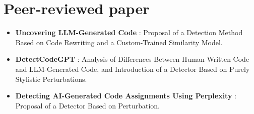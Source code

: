 \section*{Peer-reviewed paper}
\begin{itemize}
    \item \textbf{Uncovering LLM-Generated Code} \cite{ye2025uncovering}: 
    Proposal of a Detection Method Based on Code Rewriting and a Custom-Trained Similarity Model.

    \item \textbf{DetectCodeGPT} \cite{shi2024between}: 
    Analysis of Differences Between Human-Written Code and LLM-Generated Code, 
    and Introduction of a Detector Based on Purely Stylistic Perturbations.
    
    \item \textbf{Detecting AI-Generated Code Assignments Using Perplexity} \cite{xu2024detecting}: 
    Proposal of a Detector Based on Perturbation.
    

\end{itemize}
